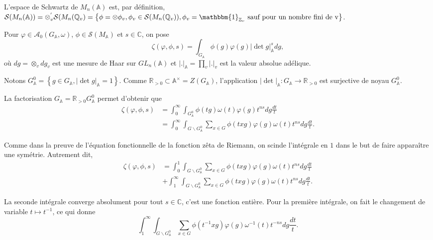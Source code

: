 L'espace de Schwartz de $M_n(\mathbb{A})$ est, par définition, $\mathcal{S}(M_n(\mathbb{A}))=\otimes_v^{'} \mathcal{S}(M_n(\mathbb{Q}_v)=\left\lbrace \phi = \otimes \phi_v, \phi_v \in \mathcal{S}(M_n(\mathbb{Q}_v)), \phi_v = \mathbbm{1}_{\mathbb{Z}_v} \text{ sauf pour un nombre fini de v} \right\rbrace$.

Pour $\varphi \in \mathcal{A}_0(G_\mathbb{A}, \omega)$, $\phi \in \mathcal{S}(M_\mathbb{A})$ et $s \in \mathbb{C}$, on pose
\begin{equation}
\zeta(\varphi, \phi, s) = \int_{G_\mathbb{A}} \phi(g) \varphi(g) |\det g|_\mathbb{A}^s dg,
\end{equation}
où $dg = \otimes_v dg_v$ est une mesure de Haar sur $GL_n(\mathbb{A})$ et $|.|_\mathbb{A} = \prod_v |.|_v$ est la valeur absolue adélique.

Notons $G^0_\mathbb{A}=\left\lbrace g \in G_\mathbb{A}, |\det g|_\mathbb{A} = 1 \right\rbrace$. Comme $\mathbb{R}_{> 0} \subset \mathbb{A}^\times=Z(G_\mathbb{A})$, l'application $|\det|_\mathbb{A} : G_\mathbb{A} \rightarrow \mathbb{R}_{> 0}$ est surjective de noyau $G^0_\mathbb{A}$.

La factorisation $G_\mathbb{A} = \mathbb{R}_{> 0}G^0_\mathbb{A}$ permet d'obtenir que
\begin{align}
\zeta(\varphi, \phi, s) &= \int_0^\infty \int_{G^0_\mathbb{A}} \phi(tg) \omega(t) \varphi(g) t^{ns} dg \frac{dt}{t} \\
&= \int_0^\infty \int_{G \backslash G^0_\mathbb{A}} \sum_{x \in G}{\phi(txg)} \varphi(g) \omega(t) t^{ns} dg \frac{dt}{t}.
\end{align}

Comme dans la preuve de l'équation fonctionnelle de la fonction zêta de Riemann, on scinde l'intégrale en $1$ dans le but de faire apparaître une symétrie. Autrement dit,
\begin{equation}
\begin{split}
\zeta(\varphi, \phi, s) &= \int_0^1 \int_{G \backslash G^0_\mathbb{A}} \sum_{x \in G}{\phi(txg)} \varphi(g) \omega(t) t^{ns} dg \frac{dt}{t} \\
&+ \int_1^\infty \int_{G \backslash G^0_\mathbb{A}} \sum_{x \in G}{\phi(txg)} \varphi(g) \omega(t) t^{ns} dg \frac{dt}{t}.
\end{split}
\end{equation}

La seconde intégrale converge absolument pour tout $s \in \mathbb{C}$, c'est une fonction entière. Pour la première intégrale, on fait le changement de variable $t \mapsto t^{-1}$, ce qui donne
\begin{equation}
\int_1^\infty \int_{G \backslash G^0_\mathbb{A}} \sum_{x \in G}{\phi(t^{-1}xg)} \varphi(g) \omega^{-1}(t) t^{-ns} dg \frac{dt}{t}.
\end{equation}


